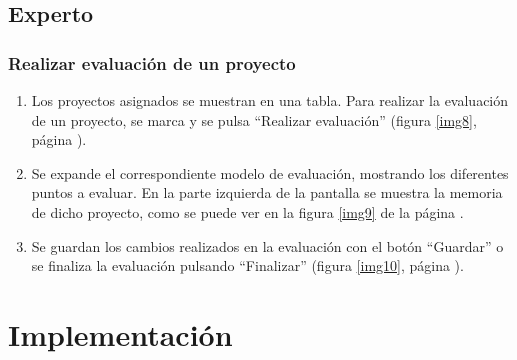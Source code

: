 \documentclass[11pt,a4paper,spanish,twoside]{book}
\begin{document}
\section{Experto}
\subsection{Realizar evaluación de un proyecto}
\begin{enumerate}
\item Los proyectos asignados se muestran en una tabla. Para realizar la 
  evaluación de un proyecto, se marca y se pulsa ``Realizar evaluación''
  (figura \ref{img8}, página \pageref{img8}). 


\item Se expande el correspondiente modelo de evaluación, mostrando los 
  diferentes puntos a evaluar. En la parte izquierda de la pantalla se
  muestra la memoria de dicho proyecto, como se puede ver en la figura
  \ref{img9} de la página \pageref{img9}. 


\item Se guardan los cambios realizados en la evaluación con el botón 
  ``Guardar'' o se finaliza la evaluación pulsando ``Finalizar'' (figura 
  \ref{img10}, página \pageref{img1}).
  
\end{enumerate}

\chapter{Implementación}
\end{document}
